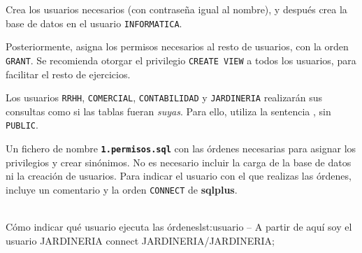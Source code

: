 \begin{homeworkProblem}
  Crea los usuarios necesarios (con contraseña igual al nombre), y después crea la base de datos en el usuario \texttt{INFORMATICA}.

  Posteriormente, asigna los permisos necesarios al resto de usuarios, con la orden \texttt{GRANT}.   Se recomienda otorgar el privilegio \texttt{CREATE VIEW} a todos los usuarios, para facilitar el resto de ejercicios.
  
  Los usuarios \texttt{RRHH}, \texttt{COMERCIAL}, \texttt{CONTABILIDAD} y \texttt{JARDINERIA} realizarán sus consultas como si las tablas fueran \textit{suyas}. Para ello, utiliza la sentencia , sin \texttt{PUBLIC}.

  \begin{Aviso}
    Un fichero de nombre \textbf{\texttt{1.permisos.sql}} con las órdenes necesarias para asignar los privilegios y crear sinónimos. No es necesario incluir la carga de la base de datos ni la creación de usuarios.
    Para indicar el usuario con el que realizas las órdenes, incluye un comentario y la orden \texttt{CONNECT} de \textbf{sqlplus}.
    \\
    \\
\begin{listadosql}{Cómo indicar qué usuario ejecuta las órdenes}{lst:usuario}
-- A partir de aquí soy el usuario JARDINERIA
connect JARDINERIA/JARDINERIA;
\end{listadosql}
  \end{Aviso}

\end{homeworkProblem}





